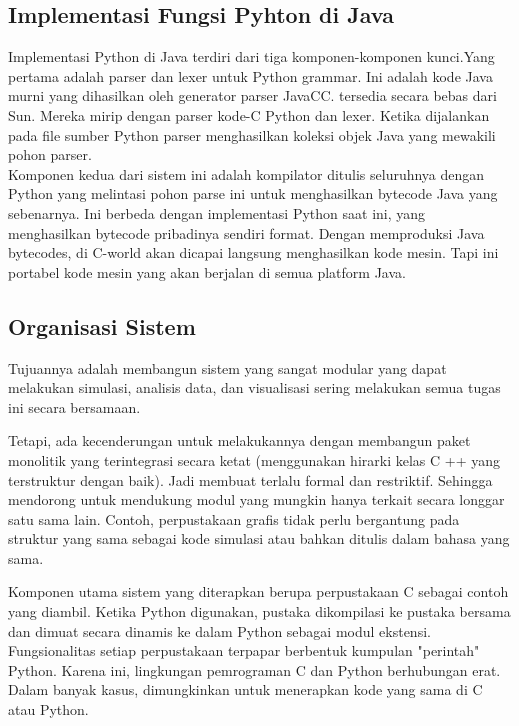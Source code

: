 \documentclass[12pt,a4paper]{article}
\begin{document}
\subsection{Implementasi Fungsi Pyhton di Java}

Implementasi Python di Java terdiri dari tiga komponen-komponen kunci.Yang pertama adalah parser dan lexer untuk Python grammar. Ini adalah kode Java murni yang dihasilkan oleh generator parser JavaCC. tersedia secara bebas dari Sun. Mereka mirip dengan parser kode-C Python dan lexer. Ketika dijalankan pada file sumber Python parser menghasilkan koleksi objek Java yang mewakili pohon parser.\\

Komponen kedua dari sistem ini adalah kompilator ditulis seluruhnya dengan Python yang melintasi pohon parse ini untuk menghasilkan bytecode Java yang sebenarnya. Ini berbeda dengan implementasi Python saat ini, yang menghasilkan bytecode pribadinya sendiri format. Dengan memproduksi Java bytecodes, di C-world akan dicapai langsung menghasilkan kode mesin. Tapi ini portabel kode mesin yang akan berjalan di semua platform Java.

\subsection{Organisasi Sistem}

Tujuannya adalah membangun sistem yang sangat modular yang dapat melakukan simulasi, analisis data, dan visualisasi sering melakukan semua tugas ini secara bersamaan. 

Tetapi, ada kecenderungan untuk melakukannya dengan membangun paket monolitik yang terintegrasi secara ketat (menggunakan hirarki kelas C ++ yang terstruktur dengan baik). Jadi membuat  terlalu formal dan restriktif.  Sehingga mendorong untuk mendukung modul yang mungkin hanya terkait secara longgar satu sama lain. Contoh, perpustakaan grafis tidak perlu bergantung pada struktur yang sama sebagai kode simulasi atau bahkan ditulis dalam bahasa yang sama.

Komponen utama sistem yang diterapkan  berupa perpustakaan C sebagai contoh yang diambil. Ketika Python digunakan, pustaka dikompilasi ke pustaka bersama dan dimuat secara dinamis ke dalam Python sebagai modul ekstensi. Fungsionalitas setiap perpustakaan terpapar berbentuk kumpulan "perintah" Python. Karena ini, lingkungan pemrograman C dan Python berhubungan erat. Dalam banyak kasus, dimungkinkan untuk menerapkan kode yang sama di C atau Python. 
\end{document}
